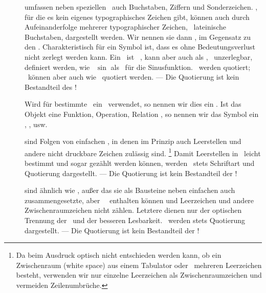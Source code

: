 \begin{description}

	\item [\Symbole] umfassen neben speziellen \Symbolen\ auch Buchstaben, Ziffern und Sonderzeichen.
	\Symbole, für die es kein eigenes typographisches Zeichen gibt, können auch durch Aufeinanderfolge mehrerer typographischer Zeichen, \textiAlg\ lateinische Buchstaben, dargestellt werden.
	Wir nennen sie dann , im Gegensatz zu den .
	Charakteristisch für ein Symbol ist, dass es ohne Bedeutungsverlust nicht zerlegt werden kann.
	Ein \zusammengesetztesSymbol\ ist \textiAlg\ \zerlegbar, kann aber auch als \atomar, \textdh\ unzerlegbar, definiert werden, wie \textzB\ $\sin$ als \Symbol\ für die Sinusfunktion.
	\Symbole\ werden  quotiert; \zerlegbare\ können aber auch wie \Zeichenfolgen\ quotiert werden.
	--- Die Quotierung ist kein Bestandteil des \Symbols!

	Wird für bestimmte \Objekte\ ein \Symbol\ verwendet, so nennen wir dies ein .
	Ist das Objekt eine Funktion, Operation, Relation \textusw, so nennen wir das Symbol ein , ,  usw.

	\item [\Zeichenketten] sind Folgen von einfachen \Symbolen, in denen im Prinzip auch Leerstellen und andere nicht druckbare Zeichen zulässig sind.%
	\footnote{%
		Da beim Ausdruck optisch nicht entschieden werden kann, ob ein Zwischenraum (white space) aus einem Tabulator oder \textevtl\ mehreren Leerzeichen besteht, verwenden wir nur einzelne Leerzeichen als Zwischenraumzeichen und vermeiden Zeilenumbrüche.
	}
	Damit Leerstellen in \Zeichenketten\ leicht bestimmt und sogar gezählt werden können,
	werden \Zeichenketten\ stets  Schriftart und Quotierung dargestellt.
	--- Die Quotierung ist kein Bestandteil der \Zeichenkette!

	\item [\Zeichenfolgen] sind ähnlich wie \Zeichenketten, außer das sie als Bausteine neben einfachen auch zusammengesetzte, aber \atomare\ \Symbole\ enthalten können und Leerzeichen und andere Zwischenraumzeichen nicht zählen.
	Letztere dienen nur der optischen Trennung der \Symbole\ und der besseren Lesbarkeit.
	\Zeichenfolgen\ werden stets  Quotierung dargestellt.
	--- Die Quotierung ist kein Bestandteil der \Zeichenfolge!


\end{description}
